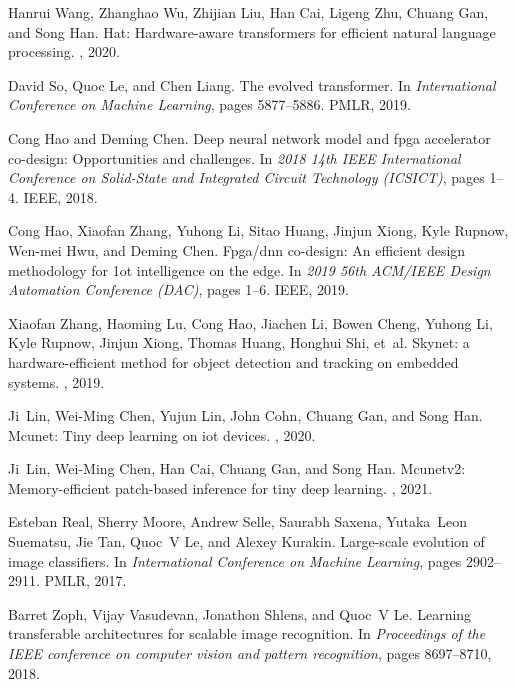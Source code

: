 \documentclass{article}
\begin{document}
\begin{thebibliography}{10}
Hanrui Wang, Zhanghao Wu, Zhijian Liu, Han Cai, Ligeng Zhu, Chuang Gan, and
  Song Han.
\newblock Hat: Hardware-aware transformers for efficient natural language
  processing.
, 2020.

David So, Quoc Le, and Chen Liang.
\newblock The evolved transformer.
\newblock In {\em International Conference on Machine Learning}, pages
  5877--5886. PMLR, 2019.

Cong Hao and Deming Chen.
\newblock Deep neural network model and fpga accelerator co-design:
  Opportunities and challenges.
\newblock In {\em 2018 14th IEEE International Conference on Solid-State and
  Integrated Circuit Technology (ICSICT)}, pages 1--4. IEEE, 2018.

Cong Hao, Xiaofan Zhang, Yuhong Li, Sitao Huang, Jinjun Xiong, Kyle Rupnow,
  Wen-mei Hwu, and Deming Chen.
\newblock Fpga/dnn co-design: An efficient design methodology for 1ot
  intelligence on the edge.
\newblock In {\em 2019 56th ACM/IEEE Design Automation Conference (DAC)}, pages
  1--6. IEEE, 2019.

Xiaofan Zhang, Haoming Lu, Cong Hao, Jiachen Li, Bowen Cheng, Yuhong Li, Kyle
  Rupnow, Jinjun Xiong, Thomas Huang, Honghui Shi, et~al.
\newblock Skynet: a hardware-efficient method for object detection and tracking
  on embedded systems.
, 2019.

Ji~Lin, Wei-Ming Chen, Yujun Lin, John Cohn, Chuang Gan, and Song Han.
\newblock Mcunet: Tiny deep learning on iot devices.
, 2020.

Ji~Lin, Wei-Ming Chen, Han Cai, Chuang Gan, and Song Han.
\newblock Mcunetv2: Memory-efficient patch-based inference for tiny deep
  learning.
, 2021.

Esteban Real, Sherry Moore, Andrew Selle, Saurabh Saxena, Yutaka~Leon Suematsu,
  Jie Tan, Quoc~V Le, and Alexey Kurakin.
\newblock Large-scale evolution of image classifiers.
\newblock In {\em International Conference on Machine Learning}, pages
  2902--2911. PMLR, 2017.

Barret Zoph, Vijay Vasudevan, Jonathon Shlens, and Quoc~V Le.
\newblock Learning transferable architectures for scalable image recognition.
\newblock In {\em Proceedings of the IEEE conference on computer vision and
  pattern recognition}, pages 8697--8710, 2018.


\end{thebibliography}
\end{document}
